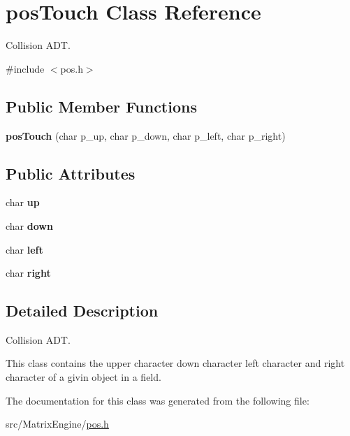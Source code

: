 \hypertarget{classposTouch}{}\section{pos\+Touch Class Reference}
\label{classposTouch}


Collision A\+DT.  




{\ttfamily \#include $<$pos.\+h$>$}

\subsection*{Public Member Functions}
\begin{DoxyCompactItemize}
\item 
\mbox{\label{classposTouch_ade8f993b72293c75078b0bffc9d21248}} 
{\bfseries pos\+Touch} (char p\+\_\+up, char p\+\_\+down, char p\+\_\+left, char p\+\_\+right)
\end{DoxyCompactItemize}
\subsection*{Public Attributes}
\begin{DoxyCompactItemize}
\item 
\mbox{\label{classposTouch_aef77e026b1e99304109e77e7f57e6ecb}} 
char {\bfseries up}
\item 
\mbox{\label{classposTouch_a22c07e665a19437432b5119ebcd1e01b}} 
char {\bfseries down}
\item 
\mbox{\label{classposTouch_a395f71bed29f938d2c6d11521853eff1}} 
char {\bfseries left}
\item 
\mbox{\label{classposTouch_adab18842bd49d43c45faf4af3b418ac6}} 
char {\bfseries right}
\end{DoxyCompactItemize}


\subsection{Detailed Description}
Collision A\+DT. 

This class contains the upper character down character left character and right character of a givin object in a field. 

The documentation for this class was generated from the following file\+:\begin{DoxyCompactItemize}
\item 
src/\+Matrix\+Engine/\hyperlink{pos_8h}{pos.\+h}\end{DoxyCompactItemize}
